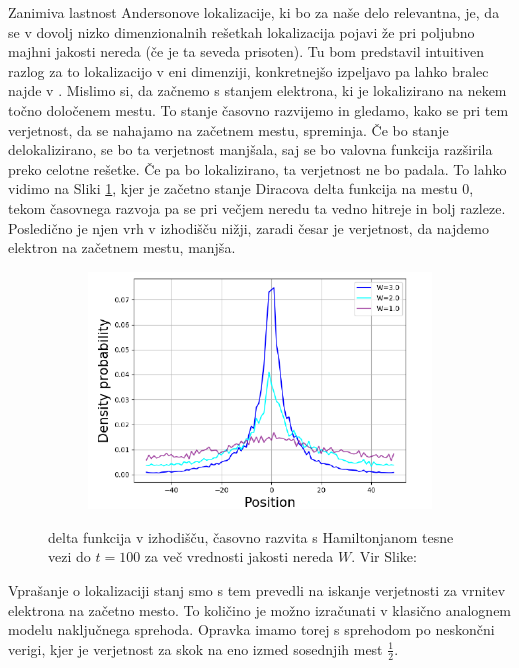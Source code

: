 Zanimiva lastnost Andersonove lokalizacije, ki bo za naše delo relevantna, je, da se v dovolj nizko dimenzionalnih rešetkah lokalizacija pojavi že pri poljubno majhni jakosti nereda (če je ta seveda prisoten). Tu bom predstavil intuitiven razlog za to lokalizacijo v eni dimenziji, konkretnejšo izpeljavo pa lahko bralec najde v \cite{anderson}.
Mislimo si, da začnemo s stanjem elektrona, ki je lokalizirano na nekem točno določenem mestu. To stanje časovno razvijemo in gledamo, kako se pri tem verjetnost, da se nahajamo na začetnem mestu, spreminja. Če bo stanje delokalizirano, se bo ta verjetnost manjšala, saj se bo valovna funkcija razširila preko celotne rešetke. Če pa bo lokalizirano, ta verjetnost ne bo padala. To lahko vidimo na Sliki \ref{fig:AndersonTime}, kjer je začetno stanje Diracova delta funkcija  na mestu $0$, tekom časovnega razvoja pa se pri večjem neredu ta vedno hitreje in bolj razleze. Posledično je njen vrh v izhodišču nižji, zaradi česar je verjetnost, da najdemo elektron na začetnem mestu, manjša.
\begin{figure}[H]
\centering
\begin{subfigure}{.5\textwidth}
\includegraphics[width=\linewidth]{Figures/AndersonTime.pdf}
\end{subfigure}
\caption{delta funkcija v izhodišču, časovno razvita s Hamiltonjanom tesne vezi do $t=100$ za več vrednosti jakosti nereda $W$. Vir Slike: \cite{anderson}}
\label{fig:AndersonTime}
\end{figure}
Vprašanje o lokalizaciji stanj smo s tem prevedli na iskanje verjetnosti za vrnitev elektrona na začetno mesto. To količino je možno izračunati v klasično analognem modelu naključnega sprehoda. 
Opravka imamo torej s sprehodom po neskončni verigi, kjer je verjetnost za skok na eno izmed sosednjih mest $\frac{1}{2}$. 
